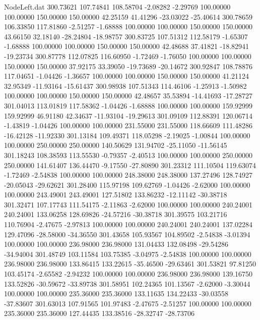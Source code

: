 \begin{filecontents}{NodeLeft.dat}
 300.73621  107.74841  108.58704    -2.08282   -2.29769  100.00000  100.00000  150.00000  150.00000   42.25159   41.41296  -23.03022  -25.40614
 300.78659  106.33850  117.81860    -2.51257   -1.68888  100.00000  100.00000  150.00000  150.00000   43.66150   32.18140  -28.24804  -18.98757
 300.83725  107.51312  112.58179    -1.65307   -1.68888  100.00000  100.00000  150.00000  150.00000   42.48688   37.41821  -18.82941  -19.23734
 300.87778  112.07825  116.60950    -1.72469   -1.76050  100.00000  100.00000  150.00000  150.00000   37.92175   33.39050  -19.73689  -20.14672
 300.92847  108.78876  117.04651    -1.04426   -1.36657  100.00000  100.00000  150.00000  150.00000   41.21124   32.95349  -11.93164  -15.61437
 300.98938  107.51343  114.46106    -1.25913   -1.50982  100.00000  100.00000  150.00000  150.00000   42.48657   35.53894  -14.41693  -17.28727
 301.04013  113.01819  117.58362    -1.04426   -1.68888  100.00000  100.00000  159.92999  159.92999   46.91180   42.34637  -11.93104  -19.29613
 301.09109  112.88391  120.06714    -1.43819   -1.04426  100.00000  100.00000  231.55000  231.55000  118.66609  111.48286  -16.42128  -11.92330
 301.13184  109.49371  118.05298    -2.19025   -1.00844  100.00000  100.00000  250.00000  250.00000  140.50629  131.94702  -25.11050  -11.56145
 301.18243  108.38593  113.55530    -0.79357   -2.40513  100.00000  100.00000  250.00000  250.00000  141.61407  136.44470   -9.17550  -27.80890
 301.23312  111.10504  119.63074    -1.72469   -2.54838  100.00000  100.00000  248.38000  248.38000  137.27496  128.74927  -20.05043  -29.62621
 301.28400  115.97198  109.62769    -1.04426   -2.62000  100.00000  100.00000  243.49001  243.49001  127.51802  133.86232  -12.11142  -30.38718
 301.32471  107.17743  111.54175    -2.11863   -2.62000  100.00000  100.00000  240.24001  240.24001  133.06258  128.69826  -24.57216  -30.38718
 301.39575  103.21716  110.76904    -2.47675   -2.97813  100.00000  100.00000  240.24001  240.24001  137.02284  129.47096  -28.58000  -34.36550
 301.43658  105.93567  104.89502    -2.54838   -3.01394  100.00000  100.00000  236.98000  236.98000  131.04433  132.08498  -29.54286  -34.94004
 301.48749  103.11584  103.75385    -3.04975   -2.54838  100.00000  100.00000  236.98000  236.98000  133.86415  133.22615  -35.46500  -29.63461
 301.53821   97.81250  103.45174    -2.65582   -2.94232  100.00000  100.00000  236.98000  236.98000  139.16750  133.52826  -30.59672  -33.89738
 301.58951  102.24365  101.13567    -2.62000   -3.30044  100.00000  100.00000  235.36000  235.36000  133.11635  134.22433  -30.03558  -37.83607
 301.63013  107.91565  101.97483    -2.47675   -2.51257  100.00000  100.00000  235.36000  235.36000  127.44435  133.38516  -28.32747  -28.73706

\end{filecontents}
